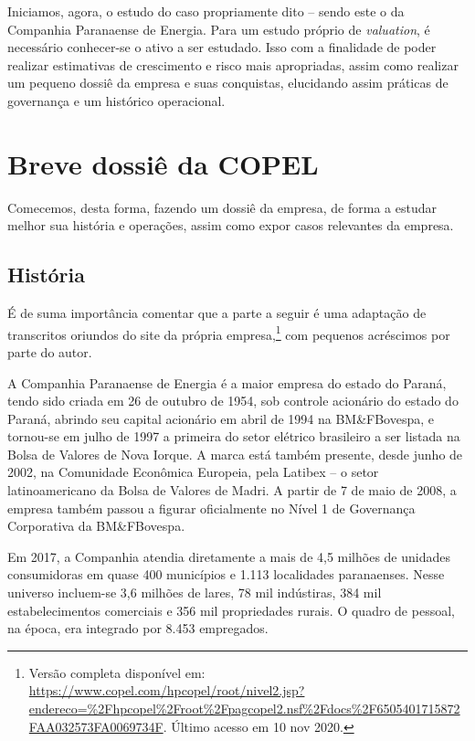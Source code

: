 \documentclass[aprovado,numbers]{coppe}
\begin{document}
  Iniciamos, agora, o estudo do caso propriamente dito -- sendo este o da Companhia Paranaense de Energia. Para um estudo próprio de \emph{valuation}, é necessário conhecer-se o ativo a ser estudado. Isso com a finalidade de poder realizar estimativas de crescimento e risco mais apropriadas, assim como realizar um pequeno dossiê da empresa e suas conquistas, elucidando assim práticas de governança e um histórico operacional.

  \hypertarget{breve-dossiuxea-da-copel}{%
  \section{Breve dossiê da COPEL}\label{breve-dossiuxea-da-copel}}

  Comecemos, desta forma, fazendo um dossiê da empresa, de forma a estudar melhor sua história e operações, assim como expor casos relevantes da empresa.

  \hypertarget{histuxf3ria}{%
  \subsection{História}\label{histuxf3ria}}

  É de suma importância comentar que a parte a seguir é uma adaptação de transcritos oriundos do site da própria empresa,\footnote{Versão completa disponível em: \url{https://www.copel.com/hpcopel/root/nivel2.jsp?endereco=\%2Fhpcopel\%2Froot\%2Fpagcopel2.nsf\%2Fdocs\%2F6505401715872FAA032573FA0069734F}. Último acesso em 10 nov 2020.} com pequenos acréscimos por parte do autor.

  A Companhia Paranaense de Energia é a maior empresa do estado do Paraná, tendo sido criada em 26 de outubro de 1954, sob controle acionário do estado do Paraná, abrindo seu capital acionário em abril de 1994 na BM\&FBovespa, e tornou-se em julho de 1997 a primeira do setor elétrico brasileiro a ser listada na Bolsa de Valores de Nova Iorque. A marca está também presente, desde junho de 2002, na Comunidade Econômica Europeia, pela Latibex -- o setor latinoamericano da Bolsa de Valores de Madri. A partir de 7 de maio de 2008, a empresa também passou a figurar oficialmente no Nível 1 de Governança Corporativa da BM\&FBovespa.

  Em 2017, a Companhia atendia diretamente a mais de 4,5 milhões de unidades consumidoras em quase 400 municípios e 1.113 localidades paranaenses. Nesse universo incluem-se 3,6 milhões de lares, 78 mil indústiras, 384 mil estabelecimentos comerciais e 356 mil propriedades rurais. O quadro de pessoal, na época, era integrado por 8.453 empregados.
\end{document}
